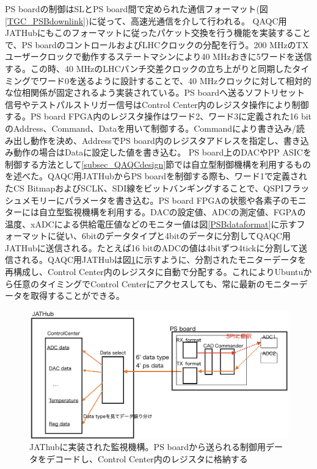 PS boardの制御はSLとPS board間で定められた通信フォーマット(図\ref{TGC_PSBdownlink})に従って、高速光通信を介して行われる。
QAQC用JATHubにもこのフォーマットに従ったパケット交換を行う機能を実装することで、PS boardのコントロールおよびLHCクロックの分配を行う。200 MHzのTXユーザークロックで動作するステートマシンにより40 MHzおきに5ワードを送信する。この時、40 MHzのLHCバンチ交差クロックの立ち上がりと同期したタイミングでワード0を送るように設計することで、40 MHzクロックに対して相対的な位相関係が固定されるよう実装されている。PS boardへ送るソフトリセット信号やテストパルストリガー信号はControl Center内のレジスタ操作により制御する。PS board FPGA内のレジスタ操作はワード2、ワード3に定義された16 bitのAddress、Command、Dataを用いて制御する。Commandにより書き込み/読み出し動作を決め、AddressでPS board内のレジスタアドレスを指定し、書き込み動作の場合はDataに設定した値を書き込む。
PS board上のDACやPP ASICを制御する方法として\ref{subsec_QAQCdesign}節では自立型制御機構を利用するものを述べた。QAQC用JATHubからPS boardを制御する際も、ワード1で定義されたCS BitmapおよびSCLK、SDI線をビットバンギングすることで、QSPIフラッシュメモリーにパラメータを書き込む。PS board FPGAの状態や各素子のモニターには自立型監視機構を利用する。DACの設定値、ADCの測定値、FGPAの温度、xADCによる供給電圧値などのモニター値は図\ref{PSBdataformat}に示すフォーマットに従い、6bitのデータタイプと4bitのデータに分割してQAQC用JATHubに送信される。たとえば16 bitのADCの値は4bitずつ4tickに分割して送信される。QAQC用JATHubは図\ref{JATHubmonitor}に示すように、分割されたモニターデータを再構成し、Control Center内のレジスタに自動で分配する。これによりUbuntuから任意のタイミングでControl Centerにアクセスしても、常に最新のモニターデータを取得することができる。
\baselineskip

\begin{figure} 
\centering
\includegraphics[width=16cm]{fig/QAQC/JATHubmonitor.png}
\caption[JATHub monitor]{JAThubに実装された監視機構。PS boardから送られる制御用データをデコードし、Control Center内のレジスタに格納する}
\label{JATHubmonitor}
\end{figure}

